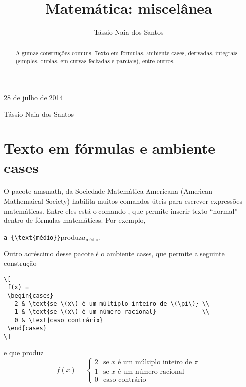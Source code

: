 \documentclass[article,openany]{memoir}
\title{Matemática: miscelânea}
\author{Tássio Naia dos Santos}
\newcommand*{\pacote}[1]{\textsf{#1}}
\newcommand*{\ambiente}[1]{\textsf{#1}}
\newenvironment{exemplo}{\begin{center}}{\end{center}}
\begin{document}



\hfill 28 de julho de 2014

\medskip

\noindent Tássio Naia dos Santos


\bigskip

\begin{abstract}
Algumas construções comuns. Texto em fórmulas, ambiente
\ambiente{cases}, derivadas, integrais (simples, duplas, em curvas
fechadas e parciais), entre outros.
\end{abstract}

\chapter{Texto em fórmulas e ambiente \ambiente{cases}}

O pacote \pacote{amsmath}, da Sociedade Matemática Americana (American
Mathemaical Society) habilita muitos comandos úteis para escrever
expressões matemáticas. Entre eles está o comando , que
permite inserir texto ``normal'' dentro de fórmulas matemáticas. Por exemplo,
\begin{exemplo}
 \verb/a_{\text{médio}}/\quad produz\quad \(\displaystyle a_{\text{médio}}\).
\end{exemplo}
Outro acréscimo desse pacote é o ambiente \ambiente{cases}, que permite a seguinte construção
\begin{verbatim}
\[
 f(x) = 
 \begin{cases}
   2 & \text{se \(x\) é um múltiplo inteiro de \(\pi\)} \\
   1 & \text{se \(x\) é um número racional}             \\
   0 & \text{caso contrário}
 \end{cases}
\]
\end{verbatim}
e que produz
\[
f(x) = 
 \begin{cases}
   2 & \text{se \(x\) é um múltiplo inteiro de \(\pi\)} \\
   1 & \text{se \(x\) é um número racional} \\
   0 & \text{caso contrário}
 \end{cases}
\]
\end{document}
